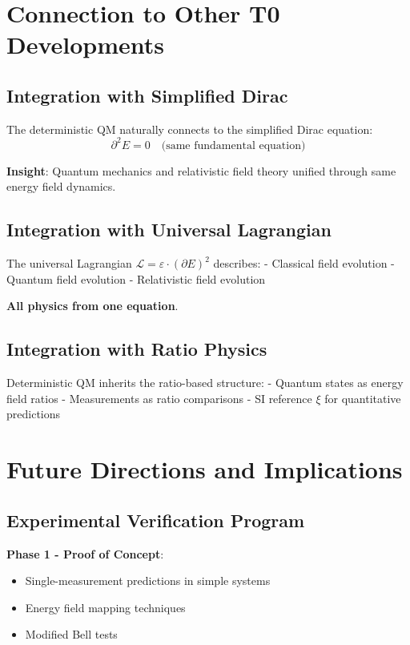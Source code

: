 \documentclass[12pt,a4paper]{article}
\newcommand{\Efield}{E}
\newcommand{\xipar}{\xi}
\begin{document}
	\section{Connection to Other T0 Developments}
	
	\subsection{Integration with Simplified Dirac}
	
	The deterministic QM naturally connects to the simplified Dirac equation:
	\begin{equation}
		\partial^2 \Efield = 0 \quad \text{(same fundamental equation)}
	\end{equation}
	
	\textbf{Insight}: Quantum mechanics and relativistic field theory unified through same energy field dynamics.
	
	\subsection{Integration with Universal Lagrangian}
	
	The universal Lagrangian $\mathcal{L} = \varepsilon \cdot (\partial \Efield)^2$ describes:
	- Classical field evolution
	- Quantum field evolution  
	- Relativistic field evolution
	
	\textbf{All physics from one equation}.
	
	\subsection{Integration with Ratio Physics}
	
	Deterministic QM inherits the ratio-based structure:
	- Quantum states as energy field ratios
	- Measurements as ratio comparisons
	- SI reference $\xipar$ for quantitative predictions
	
	\section{Future Directions and Implications}
	
	\subsection{Experimental Verification Program}
	
	\textbf{Phase 1 - Proof of Concept}:
	\begin{itemize}
		\item Single-measurement predictions in simple systems
		\item Energy field mapping techniques
		\item Modified Bell tests
	\end{itemize}
	
\end{document}
